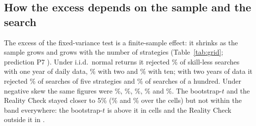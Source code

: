 \subsection{How the excess depends on the sample and the search}
\label{sec:grid}
The excess of the fixed-variance test is a finite-sample effect: it shrinks as the sample grows and grows with the number of strategies (Table~\ref{tab:grid}; prediction P7 ). Under i.i.d.\ normal returns it rejected \% of skill-less searches with one year of daily data, \% with two and \% with ten; with two years of data it rejected \% of searches of five strategies and \% of searches of a hundred. Under negative skew the same figures were \%, \%, \%, \% and \%. The bootstrap-$t$ and the Reality Check stayed closer to 5\% (\% and \% over the  cells) but not within the band everywhere: the bootstrap-$t$ is above it in  cells and the Reality Check outside it in .

